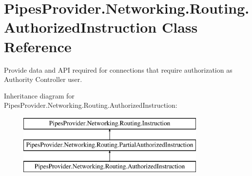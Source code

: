 \hypertarget{class_pipes_provider_1_1_networking_1_1_routing_1_1_authorized_instruction}{}\section{Pipes\+Provider.\+Networking.\+Routing.\+Authorized\+Instruction Class Reference}
\label{class_pipes_provider_1_1_networking_1_1_routing_1_1_authorized_instruction}


Provide data and A\+PI required for connections that require authorization as Authority Controller user.  


Inheritance diagram for Pipes\+Provider.\+Networking.\+Routing.\+Authorized\+Instruction\+:\begin{figure}[H]
\begin{center}
\leavevmode
\includegraphics[height=3.000000cm]{df/deb/class_pipes_provider_1_1_networking_1_1_routing_1_1_authorized_instruction}
\end{center}
\end{figure}
